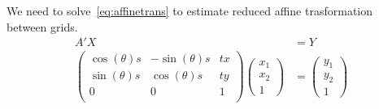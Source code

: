 \documentclass[17pt, a0paper, portrait]{tikzposter}
\begin{document}
\begin{columns}
{We need to solve~\eqref{eq:affinetrans} to estimate reduced affine trasformation between grids.
\begin{align}
    A'X &= Y \label{eq:affinetrans}\\
    \begin{pmatrix}
        \cos(\theta)s & -\sin(\theta)s & tx \\
        \sin(\theta)s & \cos(\theta)s & ty \\
        0 & 0 & 1 \\
    \end{pmatrix}
    \begin{pmatrix}
        x_1 \\
        x_2 \\
        1
    \end{pmatrix}
    &=
    \begin{pmatrix}
        y_1 \\
        y_2 \\
        1
    \end{pmatrix}
\end{align}


} %


\end{columns}
\end{document}
